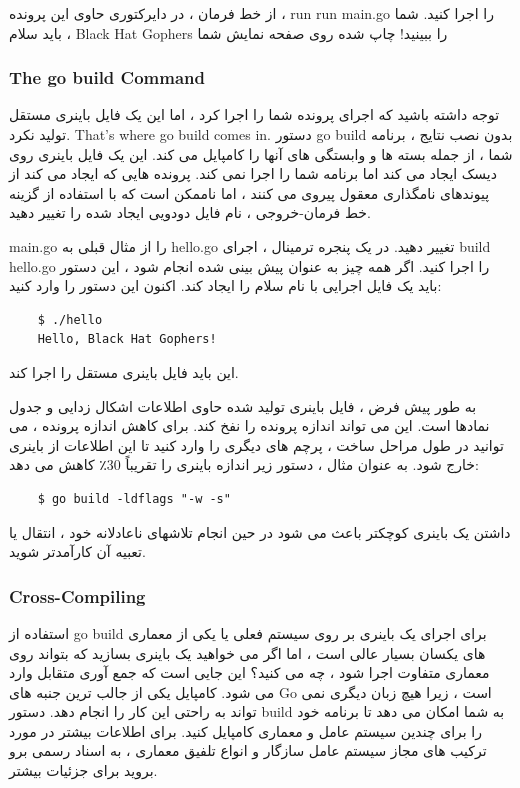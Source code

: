 \documentclass[12pt]{book}
\begin{document}
از خط فرمان ، در دایرکتوری حاوی این پرونده ، run run main.go را اجرا کنید.
شما باید سلام ، Black Hat Gophers را ببینید! چاپ شده روی صفحه نمایش شما
\subsubsection{The go build Command}
توجه داشته باشید که اجرای پرونده شما را اجرا کرد ، اما این یک فایل باینری مستقل تولید نکرد.
That’s where go build comes in.
دستور go build بدون نصب نتایج ، برنامه شما ، از جمله بسته ها و وابستگی های آنها را کامپایل می کند.
این یک فایل باینری روی دیسک ایجاد می کند اما برنامه شما را اجرا نمی کند.
پرونده هایی که ایجاد می کند از پیوندهای نامگذاری معقول پیروی می کنند ، اما ناممکن است که با استفاده از گزینه خط فرمان-خروجی ، نام فایل دودویی ایجاد شده را تغییر دهید.

main.go را از مثال قبلی به hello.go تغییر دهید.
در یک پنجره ترمینال ، اجرای build hello.go را اجرا کنید.
اگر همه چیز به عنوان پیش بینی شده انجام شود ، این دستور باید یک فایل اجرایی با نام سلام را ایجاد کند.
اکنون این دستور را وارد کنید:
\begin{latin}
	\begin{lstlisting}
	$ ./hello
	Hello, Black Hat Gophers!
	\end{lstlisting}
\end{latin}

این باید فایل باینری مستقل را اجرا کند.

به طور پیش فرض ، فایل باینری تولید شده حاوی اطلاعات اشکال زدایی و جدول نمادها است.
این می تواند اندازه پرونده را نفخ کند.
برای کاهش اندازه پرونده ، می توانید در طول مراحل ساخت ، پرچم های دیگری را وارد کنید تا این اطلاعات از باینری خارج شود.
به عنوان مثال ، دستور زیر اندازه باینری را تقریباً 30٪ کاهش می دهد:
\begin{latin}
	\begin{lstlisting}
	$ go build -ldflags "-w -s"
	\end{lstlisting}
\end{latin}

داشتن یک باینری کوچکتر باعث می شود در حین انجام تلاشهای ناعادلانه خود ، انتقال یا تعبیه آن کارآمدتر شوید.
\subsubsection{Cross-Compiling}
استفاده از go build برای اجرای یک باینری بر روی سیستم فعلی یا یکی از معماری های یکسان بسیار عالی است ، اما اگر می خواهید یک باینری بسازید که بتواند روی معماری متفاوت اجرا شود ، چه می کنید؟
این جایی است که جمع آوری متقابل وارد می شود.
کامپایل یکی از جالب ترین جنبه های Go است ، زیرا هیچ زبان دیگری نمی تواند به راحتی این کار را انجام دهد.
دستور build به شما امکان می دهد تا برنامه خود را برای چندین سیستم عامل و معماری کامپایل کنید.
برای اطلاعات بیشتر در مورد ترکیب های مجاز سیستم عامل سازگار و انواع تلفیق معماری ، به اسناد رسمی برو بروید  برای جزئیات بیشتر.
\end{document}
